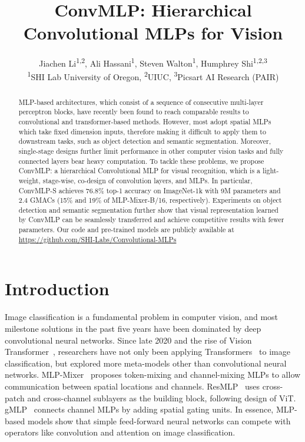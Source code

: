 \documentclass[final]{cvpr}
\begin{document}
\title{ConvMLP:  Hierarchical Convolutional MLPs for Vision}

\author{ Jiachen Li\textsuperscript{1,2}, Ali Hassani\textsuperscript{1}, Steven Walton\textsuperscript{1}, Humphrey Shi\textsuperscript{1,2,3} \\
{\small \textsuperscript{1}SHI Lab  University of Oregon, \textsuperscript{2}UIUC, \textsuperscript{3}Picsart AI Research (PAIR)}\\
}

\maketitle

\begin{abstract}
MLP-based architectures, which consist of a sequence of consecutive multi-layer perceptron blocks, have recently been found to reach comparable results to convolutional and transformer-based methods. However, most adopt spatial MLPs which take fixed dimension inputs, therefore making it difficult to apply them to downstream tasks, such as object detection and semantic segmentation. Moreover, single-stage designs further limit performance in other computer vision tasks and fully connected layers bear heavy computation. To tackle these problems, we propose ConvMLP: a hierarchical Convolutional MLP for visual recognition, which is a light-weight, stage-wise, co-design of convolution layers, and MLPs. In particular, ConvMLP-S achieves 76.8\% top-1 accuracy on ImageNet-1k with 9M parameters and 2.4 GMACs (15\% and 19\% of MLP-Mixer-B/16, respectively).
Experiments on object detection and semantic segmentation further show that visual representation learned by ConvMLP can be seamlessly transferred and achieve competitive results with fewer parameters. 
Our code and pre-trained models are publicly available at \href{https://github.com/SHI-Labs/Convolutional-MLPs}{https://github.com/SHI-Labs/Convolutional-MLPs}
\end{abstract}

\section{Introduction}
Image classification is a fundamental problem in computer vision, and most milestone solutions in the past five years have been dominated by deep convolutional neural networks. Since late 2020 and the rise of Vision Transformer~\cite{dosovitskiy2020image}, researchers have not only been applying Transformers~\cite{vaswani2017attention} to image classification, but explored more meta-models other than convolutional neural networks. MLP-Mixer~\cite{tolstikhin2021mlp} proposes token-mixing and channel-mixing MLPs to allow communication between spatial locations and channels. ResMLP~\cite{touvron2021resmlp} uses cross-patch and cross-channel sublayers as the building block, following design of ViT. gMLP~\cite{liu2021pay} connects channel MLPs by adding spatial gating units. In essence, MLP-based models show that simple feed-forward neural networks can compete with operators like convolution and attention on image classification.
\end{document}
